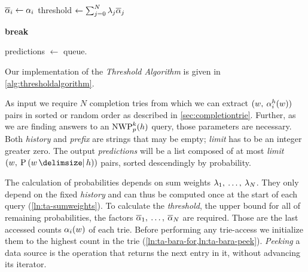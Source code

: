 \begin{algorithm}
\begin{algorithmic}[1]
      \vspace{0.7em}
      \State $\overline{\alpha}_i \gets \alpha_i$
        \label{ln:ta-bara-update}
      \State threshold $\gets \sum_{j = 0}^N \lambda_j \overline{\alpha}_j$
        \label{ln:ta-threshold}

      \vspace{0.7em}
        \label{ln:ta-done-if-2}
        \State \textbf{break}
          \label{ln:ta-done-break}
      \EndIf
    \EndWhile

    \vspace{0.7em}
    \State predictions $\gets$ queue.
      \label{ln:ta-tolist}
  \end{algorithmic}
\end{algorithm}

Our implementation of the \emph{Threshold Algorithm} is given in
\cref{alg:thresholdalgorithm}.

As input we require $N$ completion tries from which we can extract
$(w, \: \alpha^h_i(w))$ pairs in sorted or random order as described in
\cref{sec:completiontrie}.
Further, as we are finding answers to an $\NWP[p][k]{h}$ query, those parameters
are necessary.
Both \emph{history} and \emph{prefix} are strings that may be empty;
\emph{limit} has to be an integer greater zero.
The output \emph{predictions} will be a list composed of at most
\emph{limit} $(w, \: \Prob{w}{h})$ pairs, sorted descendingly by probability.

The calculation of probabilities depends on sum weights
$\lambda_1, \: \ldots, \: \lambda_N$.
They only depend on the fixed \emph{history} and can thus be computed once at
the start of each query (\cref{ln:ta-sumweights}).
To calculate the \emph{threshold}, the upper bound for all of remaining
probabilities, the factors
$\overline{\alpha}_1, \: \ldots, \: \overline{\alpha}_N$ are required.
Those are the last accessed counts $\alpha_i(w)$ of each trie.
Before performing any trie-access we initialize them to the highest count in the
trie (\cref{ln:ta-bara-for,ln:ta-bara-peek}).
\emph{Peeking} a data source is the operation that returns the next entry in it,
without advancing its iterator.

